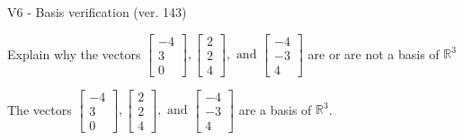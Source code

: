\begin{exercise}
  \begin{exerciseTitle}V6 - Basis verification (ver. 143)\end{exerciseTitle}
  \begin{exerciseStatement}
    Explain why the vectors \(\left[\begin{array}{r}
-4 \\
3 \\
0
\end{array}\right] , \left[\begin{array}{r}
2 \\
2 \\
4
\end{array}\right] , \text{ and } \left[\begin{array}{r}
-4 \\
-3 \\
4
\end{array}\right]\) are or are not a basis of \(\mathbb{R}^3\)	


  \end{exerciseStatement}
  \begin{exerciseAnswer}
   The vectors \(\left[\begin{array}{r}
-4 \\
3 \\
0
\end{array}\right] , \left[\begin{array}{r}
2 \\
2 \\
4
\end{array}\right] , \text{ and } \left[\begin{array}{r}
-4 \\
-3 \\
4
\end{array}\right]\) 
  	 are  a basis of \(\mathbb{R}^3\).
  


  \end{exerciseAnswer}
\end{exercise}